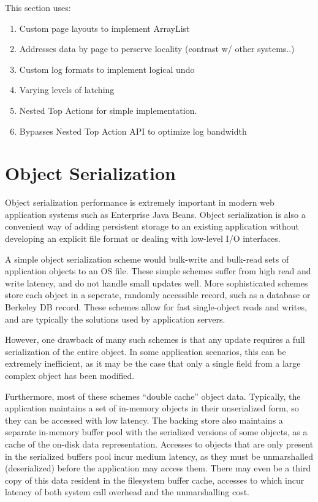 \documentclass[letterpaper,twocolumn,english]{article}
\begin{document}
This section uses:
\begin{enumerate}
\item{Custom page layouts to implement ArrayList}
\item{Addresses data by page to perserve locality (contrast w/ other systems..)}
\item{Custom log formats to implement logical undo}
\item{Varying levels of latching}
\item{Nested Top Actions for simple implementation.}
\item{Bypasses Nested Top Action API to optimize log bandwidth}
\end{enumerate}

\section{Object Serialization}
\label{OASYS}

Object serialization performance is extremely important in modern web
application systems such as Enterprise Java Beans.  Object
serialization is also a convenient way of adding persistent storage to
an existing application without developing an explicit file format or
dealing with low-level I/O interfaces.

A simple object serialization scheme would bulk-write and bulk-read
sets of application objects to an OS file.  These simple
schemes suffer from high read and write latency, and do not handle
small updates well.  More sophisticated schemes store each object in a
seperate, randomly accessible record, such as a database  or
 Berkeley DB record.  These schemes allow for fast single-object reads and writes, and are typically the solutions used by
application servers.

However, one drawback of many such schemes is that any update requires
a full serialization of the entire object. In some application
scenarios, this can be extremely inefficient, as it may be the case
that only a single field from a large complex object has been
modified.

Furthermore, most of these schemes ``double cache'' object
data.  Typically, the application maintains a set of in-memory
objects in their unserialized form, so they can be accessed with low latency.
The backing store also
maintains a separate in-memory buffer pool with the serialized versions of
some objects, as a cache of the on-disk data representation.
Accesses to objects that are only present in the serialized buffers
pool incur medium latency, as they must be unmarshalled (deserialized)
before the application may access them.  
There may even be a third copy of this data resident in the filesystem 
buffer cache, accesses to which incur latency of both system call overhead and
the unmarshalling cost.
\end{document}
